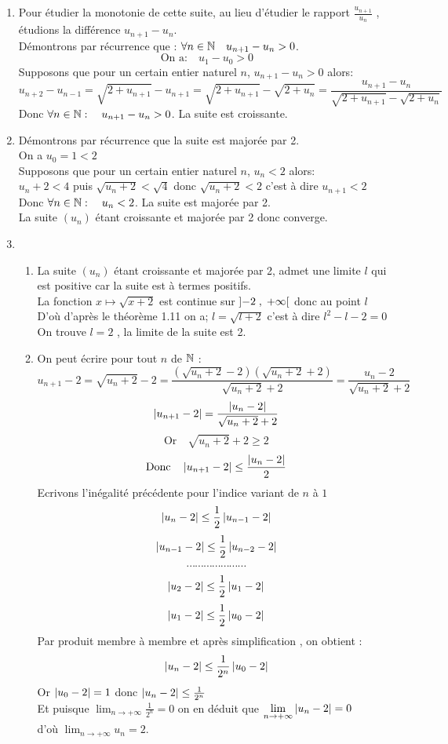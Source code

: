 \begin{enumerate}
\item Pour étudier la monotonie de cette suite, au lieu d'étudier le rapport $ \frac{u_{n+1}}{u_{n}} $ , étudions la différence $ u_{n+1}-u_{n} $.\\
Démontrons par récurrence que : $ \forall n\in\mathbb{N}\quad u_{n+1}-u_{n}>0 $. 
\[  \textrm{On a:} \quad u_{1}-u_{0}>0\]
Supposons que pour un certain entier naturel $ n $, $u_{n+1}-u_{n}>0 $ alors:
\[u_{n+2}-u_{n-1}=\sqrt{2+u_{n+1}}-u_{n+1}= \sqrt{2+u_{n+1}}-\sqrt{2+u_{n}}=\frac{u_{n+1}-u_{n}}{ \sqrt{2+u_{n+1}}-\sqrt{2+u_{n}}}\]
Donc $ \forall n\in\mathbb{N}:\quad u_{n+1}-u_{n}>0 $. La suite est croissante.
\item Démontrons par récurrence que la suite est majorée par 2.\\
On a $ u_{0}=1<2 $\\
Supposons que pour un certain entier naturel $ n $, $u_{n}<2 $ alors:\\
$ u_{n}+2<4 $ puis $ \sqrt{u_{n}+2}<\sqrt{4} $ donc $ \sqrt{u_{n}+2}<2 $ c'est à dire $ u_{n+1}<2 $\\
Donc $ \forall n\in\mathbb{N}:\quad u_{n}<2 $. La suite est majorée par 2.\\
La suite $ (u_{n}) $ étant croissante et majorée par 2 donc converge.
\item
\begin{enumerate}
\item La suite $ (u_{n}) $ étant croissante et majorée par 2, admet une limite $ l $ qui est positive car la suite est à termes positifs.\\
La fonction $ x\mapsto \sqrt{x+2}$ est continue sur $ \left]-2 \;,\; +\infty\right[$ donc au point $l$\\
D'où d'après le théorème 1.11 on a; $ l=\sqrt{l+2}  $ c'est à dire $ l^{2}-l-2 =0 $\\
On trouve $ l=2 $ , la limite de la suite est 2.
\item On peut écrire pour tout $ n $ de $ \mathbb{N} $ :
\[u_{n+1} -2=\sqrt{u_{n}+2}-2=\frac{(\sqrt{u_{n}+2}-2)(\sqrt{u_{n}+2}+2)}{\sqrt{u_{n}+2}+2}=\frac{u_{n}-2}{\sqrt{u_{n}+2}+2}\]
\[  \left\lvert u_{n+1} -2 \right\rvert=\frac{\left\lvert u_{n}-2 \right\rvert}{\sqrt{u_{n}+2}+2}\]
\[\textrm{Or} \quad \sqrt{u_{n}+2}+2\geq 2 \]
\[ \textrm{Donc} \quad\left\lvert u_{n+1} -2 \right\rvert\leq\frac{\left\lvert u_{n}-2 \right\rvert}{2}\]
Ecrivons l'inégalité précédente  pour l'indice variant de $ n$ à $1 $
\[ \left\lvert u_{n} -2 \right\rvert\leq\frac{1}{2}\left\lvert u_{n-1}-2 \right\rvert\]
\[ \left\lvert u_{n-1} -2 \right\rvert\leq\frac{1}{2}\left\lvert u_{n-2}-2 \right\rvert\]
\[\cdots\cdots\cdots\cdots\cdots\cdots\cdots \]
\[ \left\lvert u_{2} -2 \right\rvert\leq\frac{1}{2}\left\lvert u_{1}-2 \right\rvert\]
\[\left\lvert u_{1} -2 \right\rvert\leq\frac{1}{2}\left\lvert u_{0}-2 \right\rvert\]
Par produit membre à membre et après simplification , on obtient : 
\[ \left\lvert u_{n} -2 \right\rvert\leq\frac{1}{2^{n}}\left\lvert u_{0}-2 \right\rvert\]
Or $ \left\lvert u_{0}-2 \right\rvert=1 $ donc $ \left\lvert u_{n} -2 \right\rvert\leq\frac{1}{2^{n}} $\\
Et puisque $\displaystyle\lim_{n \to  +\infty} \frac{1}{2^{n}}= 0$ on en déduit que $\displaystyle\lim_{n \to  +\infty} \left\lvert u_{n}-2 \right\rvert=0$ \\
 d'où $\displaystyle\lim_{n \to  +\infty}u_{n}=2$.

\end{enumerate}
\end{enumerate}

